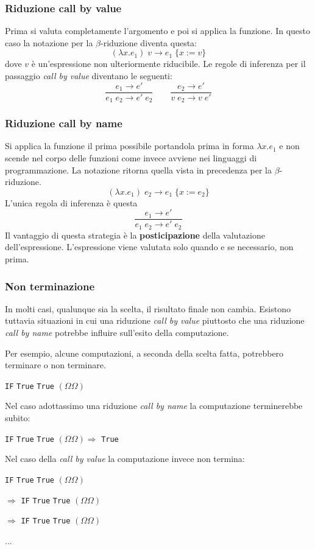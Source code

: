 \subsubsection{Riduzione call by value}
Prima si valuta completamente l'argomento e poi si applica la funzione. In questo caso la notazione per la
$\beta$-riduzione diventa questa:
\[ (\lambda x.e_1) \; v \rightarrow e_1 \; \{ x := v \} \]
dove $v$ è un'espressione non ulteriormente riducibile. Le regole di inferenza per il passaggio \emph{call by value}
diventano le seguenti:
\[
	\frac{e_1 \rightarrow e'}{e_1 \; e_2 \rightarrow e' \; e_2} \quad \quad
	\frac{e_2 \rightarrow e'}{v \; e_2 \rightarrow v \; e'}
\]

\subsubsection{Riduzione call by name}
Si applica la funzione il prima possibile portandola prima in forma $\lambda x.e_1$ e non scende nel corpo delle
funzioni come invece avviene nei linguaggi di programmazione. La notazione ritorna quella vista in precedenza per la
$\beta$-riduzione.
\[ (\lambda x.e_1) \; e_2 \rightarrow e_1 \; \{ x := e_2 \} \]
L'unica regola di inferenza è questa
\[ \frac{e_1 \rightarrow e'}{e_1 \; e_2 \rightarrow e' \; e_2} \]
Il vantaggio di questa strategia è la \textbf{posticipazione} della valutazione dell'espressione. L'espressione viene
valutata solo quando e se necessario, non prima.

\subsubsection{Non terminazione}
In molti casi, qualunque sia la scelta, il risultato finale non cambia. Esistono tuttavia situazioni in cui una riduzione
\emph{call by value} piuttosto che una riduzione \emph{call by name} potrebbe influire sull'esito della computazione.

Per esempio, alcune computazioni, a seconda della scelta fatta, potrebbero terminare o non terminare.
\begin{center}
	\verb|IF| \verb|True| \verb|True| $(\Omega \Omega)$
\end{center}
Nel caso adottassimo una riduzione \emph{call by name} la computazione terminerebbe subito:
\begin{center}
	\verb|IF| \verb|True| \verb|True| $(\Omega \Omega) \Rightarrow$ \verb|True|
\end{center}
Nel caso della \emph{call by value} la computazione invece non termina:
\begin{center}
	\verb|IF| \verb|True| \verb|True| $(\Omega \Omega)$

	$\Rightarrow$ \verb|IF| \verb|True| \verb|True| $(\Omega \Omega)$

	$\Rightarrow$ \verb|IF| \verb|True| \verb|True| $(\Omega \Omega)$

	...
\end{center}
